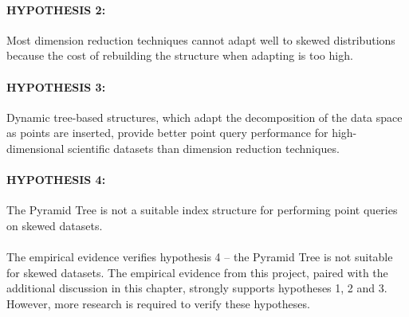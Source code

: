 \vspace{-5pt}

\paragraph{\textbf{HYPOTHESIS 2:}} Most dimension reduction techniques cannot adapt well to skewed distributions because the cost of rebuilding the structure when adapting is too high.

\vspace{-8pt}

\paragraph{\textbf{HYPOTHESIS 3:}} Dynamic tree-based structures, which adapt the decomposition of the data space as points are inserted, provide better point query performance for high-dimensional scientific datasets than dimension reduction techniques.

\vspace{-8pt}

\paragraph{\textbf{HYPOTHESIS 4:}} The Pyramid Tree is not a suitable index structure for performing point queries on skewed datasets.

\paragraph{}

\vspace{-8pt}

The empirical evidence verifies hypothesis 4 -- the Pyramid Tree is not suitable for skewed datasets. The empirical evidence from this project, paired with the additional discussion in this chapter, strongly supports hypotheses 1, 2 and 3. However, more research is required to verify these hypotheses.